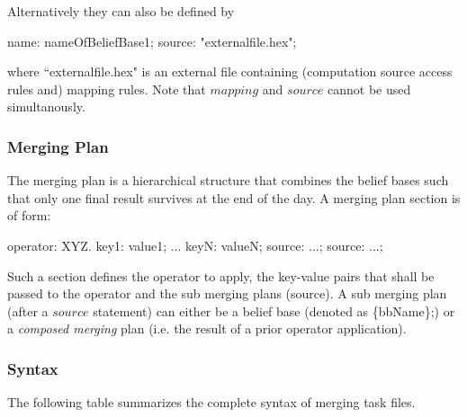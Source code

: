 \documentclass[a4paper,11pt]{article}
\theoremstyle{definition}
\newcommand{\inlinecode}[1]{\textsf{#1}\xspace }
\begin{document}
				Alternatively they can also be defined by
				\begin{exampleprogram}
name: nameOfBeliefBase1;
source: "externalfile.hex";
				\end{exampleprogram}
				where ``externalfile.hex" is an external file containing (computation source access rules and) mapping rules. Note that $\mathit{mapping}$ and $\mathit{source}$
				cannot be used simultanously.
				
			\subsubsection{Merging Plan}
			
				The merging plan is a hierarchical structure that combines the belief bases such that only one final result survives at the end of the day. A merging plan section is of
				form:
				\begin{exampleprogram}
operator: XYZ.
key1: value1;
...
keyN: valueN;
source: ...;
source: ...;
				\end{exampleprogram}
				Such a section defines the operator to apply, the key-value pairs that shall be passed to the operator and the sub merging plans (\inlinecode{source}). A sub merging plan
				(after a $\mathit{source}$ statement) can either be a belief base (denoted as \inlinecode{\{bbName\};}) or a \emph{composed merging} plan (i.e. the result of a prior operator application).

			\subsubsection{Syntax}
			
				The following table summarizes the complete syntax of merging task files.
						
\end{document}
